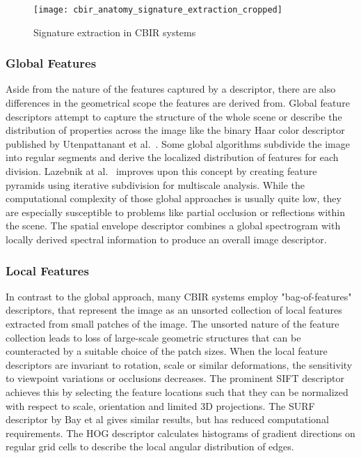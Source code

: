 \begin{figure}[h]
    \centering
        \texttt{[image: cbir\_anatomy\_signature\_extraction\_cropped]}
    \caption{Signature extraction in CBIR systems}
    \label{fig:cbir_signature_extraction}
\end{figure}

\subsubsection{Global Features}

Aside from the nature of the features captured by a descriptor, there are also
differences in the geometrical scope the features are derived from. Global
feature descriptors attempt to capture the structure of the whole scene or
describe the distribution of properties across the image like the binary Haar
color descriptor published by Utenpattanant et al.\
\autocite{utenpattanant_color_2006}. Some global algorithms subdivide the image
into regular segments and derive the localized distribution of features for
each division. Lazebnik at al.\ \autocite{lazebnik_beyond_2006}
\autocite{lazebnik_spatial_2009} improves upon this concept by creating feature
pyramids using iterative subdivision for multiscale analysis. While the
computational complexity of those global approaches is usually quite low, they
are especially susceptible to problems like partial occlusion or reflections
within the scene. The spatial envelope descriptor
\autocite{oliva_modeling_2001} combines a global spectrogram with locally
derived spectral information to produce an overall image descriptor.

\subsubsection{Local Features}

In contrast to the global approach, many CBIR systems employ "bag-of-features"
descriptors, that represent the image as an unsorted collection of local
features extracted from small patches of the image. The unsorted nature of the
feature collection leads to loss of large-scale geometric structures that can
be counteracted by a suitable choice of the patch sizes. When the local feature
descriptors are invariant to rotation, scale or similar deformations, the
sensitivity to viewpoint variations or occlusions decreases. The prominent SIFT
descriptor \autocite{lowe_object_1999} achieves this by selecting the feature
locations such that they can be normalized with respect to scale, orientation
and limited 3D projections. The SURF descriptor by Bay et al
\autocite{bay_speeded-up_2008} gives similar results, but has reduced
computational requirements. The HOG descriptor \autocite{dalal_histograms_2005}
calculates histograms of gradient directions on regular grid cells to describe
the local angular distribution of edges.

